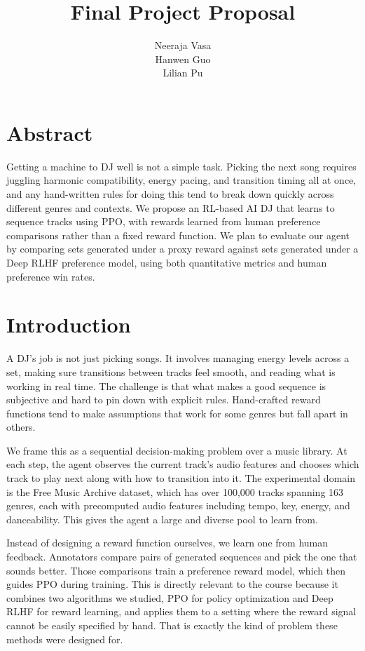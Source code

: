 \documentclass{article}
\title{Final Project Proposal}
\author{
Neeraja Vasa \\
Hanwen Guo \\
Lilian Pu
}
\begin{document}
\maketitle

\section{Abstract}

Getting a machine to DJ well is not a simple task. Picking the next song requires juggling harmonic compatibility, energy pacing, and transition timing all at once, and any hand-written rules for doing this tend to break down quickly across different genres and contexts. We propose an RL-based AI DJ that learns to sequence tracks using PPO, with rewards learned from human preference comparisons rather than a fixed reward function. We plan to evaluate our agent by comparing sets generated under a proxy reward against sets generated under a Deep RLHF preference model, using both quantitative metrics and human preference win rates.

\section{Introduction}

A DJ's job is not just picking songs. It involves managing energy levels across a set, making sure transitions between tracks feel smooth, and reading what is working in real time. The challenge is that what makes a good sequence is subjective and hard to pin down with explicit rules. Hand-crafted reward functions tend to make assumptions that work for some genres but fall apart in others.

We frame this as a sequential decision-making problem over a music library. At each step, the agent observes the current track's audio features and chooses which track to play next along with how to transition into it. The experimental domain is the Free Music Archive dataset, which has over 100,000 tracks spanning 163 genres, each with precomputed audio features including tempo, key, energy, and danceability. This gives the agent a large and diverse pool to learn from.

Instead of designing a reward function ourselves, we learn one from human feedback. Annotators compare pairs of generated sequences and pick the one that sounds better. Those comparisons train a preference reward model, which then guides PPO during training. This is directly relevant to the course because it combines two algorithms we studied, PPO for policy optimization and Deep RLHF for reward learning, and applies them to a setting where the reward signal cannot be easily specified by hand. That is exactly the kind of problem these methods were designed for.
\end{document}
